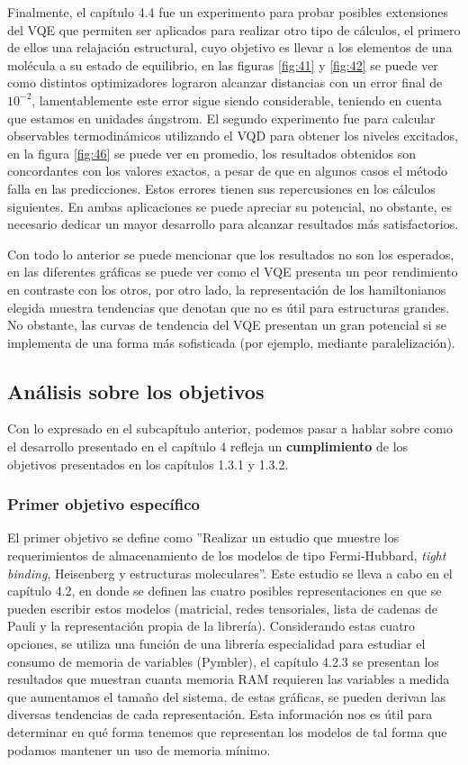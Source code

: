 Finalmente, el capítulo 4.4 fue un experimento para probar posibles extensiones del VQE que permiten ser aplicados para realizar otro tipo de cálculos, el primero de ellos una relajación estructural, cuyo objetivo es llevar a los elementos de una molécula a su estado de equilibrio, en las figuras \ref{fig:41} y \ref{fig:42} se puede ver como distintos optimizadores lograron alcanzar distancias con un error final de $10^{-2}$, lamentablemente este error sigue siendo considerable, teniendo en cuenta que estamos en unidades ángstrom. El segundo experimento fue para calcular observables termodinámicos utilizando el VQD para obtener los niveles excitados, en la figura \ref{fig:46} se puede ver en promedio, los resultados obtenidos son concordantes con los valores exactos, a pesar de que en algunos casos el método falla en las predicciones. Estos errores tienen sus repercusiones en los cálculos siguientes. En ambas aplicaciones se puede apreciar su potencial, no obstante, es necesario dedicar un mayor desarrollo para alcanzar resultados más satisfactorios.

Con todo lo anterior se puede mencionar que los resultados no son los esperados, en las diferentes gráficas se puede ver como el VQE presenta un peor rendimiento en contraste con los otros, por otro lado, la representación de los hamiltonianos elegida muestra tendencias que denotan que no es útil para estructuras grandes. No obstante, las curvas de tendencia del VQE presentan un gran potencial si se implementa de una forma más sofisticada (por ejemplo, mediante paralelización).


%
%
%
%
%
\subsection{Análisis sobre los objetivos}
Con lo expresado en el subcapítulo anterior, podemos pasar a hablar sobre como el desarrollo presentado en el capítulo 4 refleja un \textbf{cumplimiento} de los objetivos presentados en los capítulos 1.3.1 y 1.3.2.

\subsubsection{Primer objetivo específico}
El primer objetivo se define como ''Realizar un estudio que muestre los requerimientos de almacenamiento de los modelos de tipo Fermi-Hubbard, \textit{tight binding}, Heisenberg y estructuras moleculares''. Este estudio se lleva a cabo en el capítulo 4.2, en donde se definen las cuatro posibles representaciones en que se pueden escribir estos modelos (matricial, redes tensoriales, lista de cadenas de Pauli y la representación propia de la librería). Considerando estas cuatro opciones, se utiliza una función de una librería especialidad para estudiar el consumo de memoria de variables (Pymbler), el capítulo 4.2.3 se presentan los resultados que muestran cuanta memoria RAM requieren las variables a medida que aumentamos el tamaño del sistema, de estas gráficas, se pueden derivan las diversas tendencias de cada representación. Esta información nos es útil para determinar en qué forma tenemos que representan los modelos de tal forma que podamos mantener un uso de memoria mínimo.

